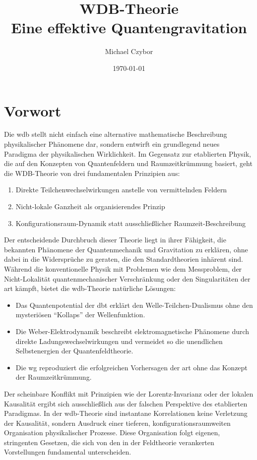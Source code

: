 \documentclass[11pt, a4paper, twoside, openright]{book}
\begin{document}
\frontmatter
\title{WDB-Theorie\\Eine effektive Quantengravitation}
\author{Michael Czybor}
\date{\today}
\maketitle

\chapter{Vorwort}
Die \gls{wdb} stellt nicht einfach eine alternative mathematische Beschreibung physikalischer Phänomene dar, sondern entwirft ein grundlegend neues Paradigma der physikalischen Wirklichkeit.
Im Gegensatz zur etablierten Physik, die auf den Konzepten von Quantenfeldern und Raumzeitkrümmung basiert, geht die WDB-Theorie von drei fundamentalen Prinzipien aus:
\begin{enumerate}
    \item Direkte Teilchenwechselwirkungen anstelle von vermittelnden Feldern
    \item Nicht-lokale Ganzheit als organisierendes Prinzip
    \item Konfigurationsraum-Dynamik statt ausschließlicher Raumzeit-Beschreibung
\end{enumerate}
Der entscheidende Durchbruch dieser Theorie liegt in ihrer Fähigkeit, die bekannten Phänomene der Quantenmechanik und Gravitation zu erklären, ohne dabei in die Widersprüche zu geraten,
die den Standardtheorien inhärent sind. Während die konventionelle Physik mit Problemen wie dem Messproblem, der Nicht-Lokalität quantenmechanischer Verschränkung oder den Singularitäten
der \gls{art} kämpft, bietet die \gls{wdb}-Theorie natürliche Lösungen:
\begin{itemize}
    \item Das Quantenpotential der \gls{dbt} erklärt den Welle-Teilchen-Dualismus ohne den mysteriösen \enquote{Kollaps} der Wellenfunktion.
    \item Die Weber-Elektrodynamik beschreibt elektromagnetische Phänomene durch direkte Ladungswechselwirkungen und vermeidet so die unendlichen Selbstenergien der Quantenfeldtheorie.
    \item Die \gls{wg} reproduziert die erfolgreichen Vorhersagen der \gls{art} ohne das Konzept der Raumzeitkrümmung.
\end{itemize}
Der scheinbare Konflikt mit Prinzipien wie der Lorentz-Invarianz oder der lokalen Kausalität ergibt sich ausschließlich aus der falschen Perspektive des etablierten Paradigmas.
In der \gls{wdb}-Theorie sind instantane Korrelationen keine Verletzung der Kausalität, sondern Ausdruck einer tieferen, konfigurationsraumweiten Organisation physikalischer Prozesse.
Diese Organisation folgt eigenen, stringenten Gesetzen, die sich von den in der Feldtheorie verankerten Vorstellungen fundamental unterscheiden.
\end{document}
